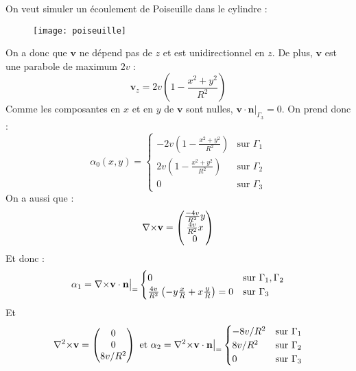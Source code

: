 On veut simuler un écoulement de Poiseuille dans le cylindre :
\begin{figure}[H]
\centering
\texttt{[image: poiseuille]}
\end{figure}
 On a donc que $\mathbf{v}$ ne dépend pas de $z$ et est unidirectionnel en $z$. De plus, $\mathbf{v}$ est une parabole de maximum $2v$ : \[ \mathbf{v}_z=2v\left(1-\frac{x^2+y^2}{R^2}\right)\]
Comme les composantes en $x$ et en $y$ de $\mathbf{v}$ sont nulles, $\mathbf{v}\cdot\mathbf{n}\big\rvert_{\Gamma_3}=0$. On prend donc :
\begin{equation}\label{alpha0}
 \alpha_0(x,y)= \begin{cases} -2v\left(1-\frac{x^2+y^2}{R^2}\right) &\mbox{sur } \Gamma_1\\
2v\left(1-\frac{x^2+y^2}{R^2}\right)&\mbox{sur } \Gamma_2\\
0 &\mbox{sur } \Gamma_3 \end{cases} \end{equation}
On a aussi que :
\[ {\nabla\times}\mathbf{v} = \begin{pmatrix}\frac{-4v}{R^2}y\\\frac{4v}{R^2}x\\0\end{pmatrix}\]
Et donc :\[\alpha_1={\nabla\times}\mathbf{v}\cdot\mathbf{n}{\big\rvert_{=}} \begin{cases} 0 &\mbox{sur } \Gamma_1,\Gamma_2\\
\frac{4v}{R^2}\left(-y\frac{x}{R} + x\frac{y}{R}\right) = 0 &\mbox{sur } \Gamma_3 \end{cases} \]
Et
\[ {\nabla^2\times}\mathbf{v} = \begin{pmatrix}0\\0\\8v/R^2\end{pmatrix}\mbox{ et } \alpha_2={\nabla^2\times}\mathbf{v}\cdot\mathbf{n}{\big\rvert_{=}} \begin{cases} -8v/R^2 &\mbox{sur } \Gamma_1\\
8v/R^2 &\mbox{sur } \Gamma_2\\ 0 &\mbox{sur } \Gamma_3 \end{cases} \]

